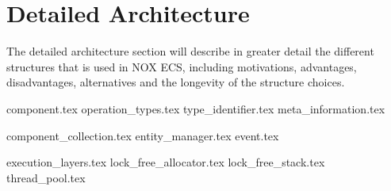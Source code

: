 \section{Detailed Architecture}
The detailed architecture section will describe in greater detail the different structures that is used in
NOX ECS, including motivations, advantages, disadvantages, alternatives and the longevity of the structure choices.


{component.tex}
{operation_types.tex}
{type_identifier.tex}
{meta_information.tex}

{component_collection.tex}
{entity_manager.tex}
{event.tex}

{execution_layers.tex}
{lock_free_allocator.tex}
{lock_free_stack.tex}
{thread_pool.tex}
